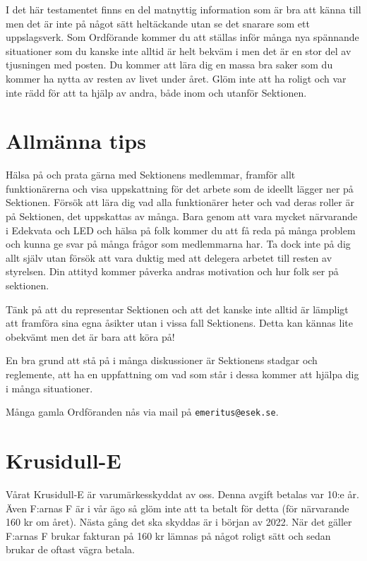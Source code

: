\documentclass[10pt]{article}
\begin{document}
\heading{\doctitle}

I det här testamentet finns en del matnyttig information som är bra att känna till men det är inte på något sätt heltäckande utan se det snarare som ett uppslagsverk. Som Ordförande kommer du att ställas inför många nya spännande situationer som du kanske inte alltid är helt bekväm i men det är en stor del av tjusningen med posten. Du kommer att lära dig en massa bra saker som du kommer ha nytta av resten av livet under året. Glöm inte att ha roligt och var inte rädd för att ta hjälp av andra, både inom och utanför Sektionen.

\newpage

\tableofcontents
\newpage

\section{Allmänna tips}

Hälsa på och prata gärna med Sektionens medlemmar, framför allt funktionärerna och visa uppskattning för det arbete som de ideellt lägger ner på Sektionen. Försök att lära dig vad alla funktionärer heter och vad deras roller är på Sektionen, det uppskattas av många. Bara genom att vara mycket närvarande i Edekvata och LED och hälsa på folk kommer du att få reda på många problem och kunna ge svar på många frågor som medlemmarna har. Ta dock inte på dig allt själv utan försök att vara duktig med att delegera arbetet till resten av styrelsen. Din attityd kommer påverka andras motivation och hur folk ser på sektionen.

Tänk på att du representar Sektionen och att det kanske inte alltid är lämpligt att framföra sina egna åsikter utan i vissa fall Sektionens. Detta kan kännas lite obekvämt men det är bara att köra på!

En bra grund att stå på i många diskussioner är Sektionens stadgar och reglemente, att ha en uppfattning om vad som står i dessa kommer att hjälpa dig i många situationer.

Många gamla Ordföranden nås via mail på \texttt{emeritus@esek.se}.

\section{Krusidull-E}

Vårat Krusidull-E är varumärkesskyddat av oss. Denna avgift betalas var 10:e år. Även F:arnas F är i vår ägo så glöm inte att ta betalt för detta (för närvarande 160 kr om året). Nästa gång det ska skyddas är i början av 2022. När det gäller F:arnas F brukar fakturan på 160 kr lämnas på något roligt sätt och sedan brukar de oftast vägra betala.
\end{document}
